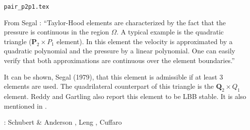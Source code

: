 \begin{flushright} {\tiny {\color{gray} \tt pair\_p2p1.tex}} \end{flushright}

\noindent
\begin{minipage}{0.54\textwidth}
From Segal \cite{segal}: ``Taylor-Hood elements \cite{taho73} 
are characterized by the fact that the pressure is continuous in the region $\Omega$. 
A typical example is the quadratic triangle (${\bm P}_2\times P_1$ element).
In this element the velocity is approximated by a quadratic polynomial and the pressure by a
linear polynomial. One can easily verify that both approximations are continuous over 
the element boundaries.''

It can be shown, Segal (1979), that this element is admissible if at least 3 elements 
are used. The quadrilateral counterpart of this triangle is the ${\bm Q}_2\times Q_1$ element.
Reddy and Gartling \cite[p179]{reddybook2} also report this element to be LBB stable.
It is also mentioned in \textcite{nath93}.

\Literature: Schubert \& Anderson \cite{scan85}, Leng \etal \cite{lejx14}, Cuffaro \etal \cite{cump20}
\end{minipage}
\hfill
\begin{minipage}{0.42\textwidth}
\begin{center}

\end{center}
\end{minipage}




